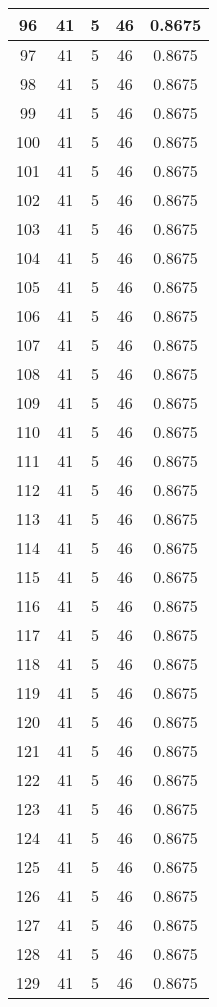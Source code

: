 \documentclass[letterpaper, 12pt]{article}
\begin{document}
\begin{longtable}{|c|c|c|c|c|}
\hline
96 & 41 & 5 & 46 & 0.8675 \\
\hline
97 & 41 & 5 & 46 & 0.8675 \\
\hline
98 & 41 & 5 & 46 & 0.8675 \\
\hline
99 & 41 & 5 & 46 & 0.8675 \\
\hline
100 & 41 & 5 & 46 & 0.8675 \\
\hline
101 & 41 & 5 & 46 & 0.8675 \\
\hline
102 & 41 & 5 & 46 & 0.8675 \\
\hline
103 & 41 & 5 & 46 & 0.8675 \\
\hline
104 & 41 & 5 & 46 & 0.8675 \\
\hline
105 & 41 & 5 & 46 & 0.8675 \\
\hline
106 & 41 & 5 & 46 & 0.8675 \\
\hline
107 & 41 & 5 & 46 & 0.8675 \\
\hline
108 & 41 & 5 & 46 & 0.8675 \\
\hline
109 & 41 & 5 & 46 & 0.8675 \\
\hline
110 & 41 & 5 & 46 & 0.8675 \\
\hline
111 & 41 & 5 & 46 & 0.8675 \\
\hline
112 & 41 & 5 & 46 & 0.8675 \\
\hline
113 & 41 & 5 & 46 & 0.8675 \\
\hline
114 & 41 & 5 & 46 & 0.8675 \\
\hline
115 & 41 & 5 & 46 & 0.8675 \\
\hline
116 & 41 & 5 & 46 & 0.8675 \\
\hline
117 & 41 & 5 & 46 & 0.8675 \\
\hline
118 & 41 & 5 & 46 & 0.8675 \\
\hline
119 & 41 & 5 & 46 & 0.8675 \\
\hline
120 & 41 & 5 & 46 & 0.8675 \\
\hline
121 & 41 & 5 & 46 & 0.8675 \\
\hline
122 & 41 & 5 & 46 & 0.8675 \\
\hline
123 & 41 & 5 & 46 & 0.8675 \\
\hline
124 & 41 & 5 & 46 & 0.8675 \\
\hline
125 & 41 & 5 & 46 & 0.8675 \\
\hline
126 & 41 & 5 & 46 & 0.8675 \\
\hline
127 & 41 & 5 & 46 & 0.8675 \\
\hline
128 & 41 & 5 & 46 & 0.8675 \\
\hline
129 & 41 & 5 & 46 & 0.8675 \\

\end{longtable}
\end{document}

